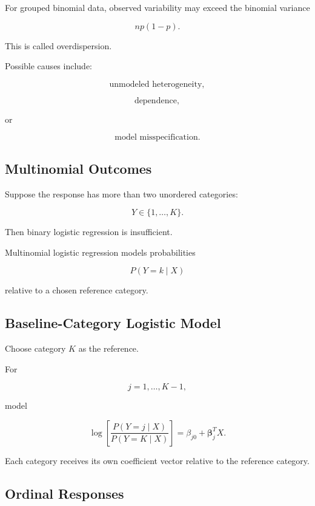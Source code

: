 For grouped binomial data, observed variability may exceed the binomial
variance

\[
np(1-p).
\]

This is called overdispersion.

Possible causes include:

\[
\boxed{
\text{unmodeled heterogeneity},
}
\]

\[
\boxed{
\text{dependence},
}
\]

or

\[
\boxed{
\text{model misspecification}.
}
\]

\subsection{Multinomial Outcomes}
\label{subsec:multinomial-outcomes}

Suppose the response has more than two unordered categories:

\[
Y\in\{1,\ldots,K\}.
\]

Then binary logistic regression is insufficient.

Multinomial logistic regression models probabilities

\[
P(Y=k\mid X)
\]

relative to a chosen reference category.

\subsection{Baseline-Category Logistic Model}
\label{subsec:baseline-category-logit}

Choose category \(K\) as the reference.

For

\[
j=1,\ldots,K-1,
\]

model

\[
\boxed{
\log
\left[
\frac{
P(Y=j\mid X)
}{
P(Y=K\mid X)
}
\right]
=
\beta_{j0}
+
\boldsymbol{\beta}_j^T X.
}
\]

Each category receives its own coefficient vector relative to the
reference category.

\subsection{Ordinal Responses}
\label{subsec:ordinal-responses}

